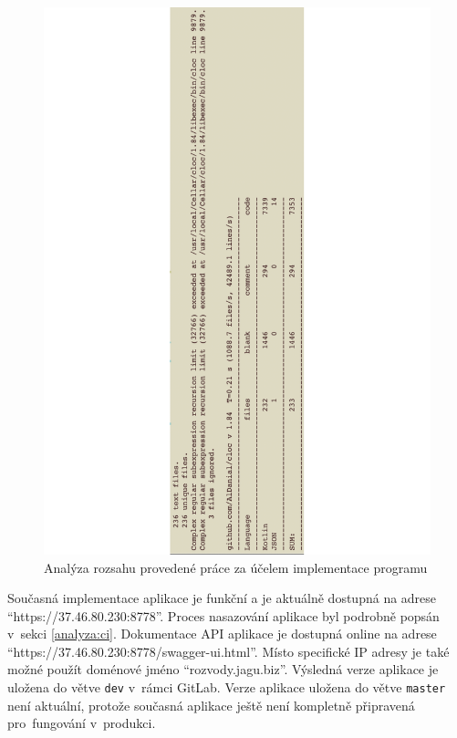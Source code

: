         \begin{figure}\centering
        	   \includegraphics[angle=-90, width=1.0\textwidth]{pdfs/CodeAmountImpl2}
        	   \caption[Analýza kódu implementace]{Analýza rozsahu provedené práce za účelem implementace programu}\label{image:code-count-main}
        \end{figure}
        
        Současná implementace aplikace je funkční a je aktuálně dostupná na adrese \enquote{https://37.46.80.230:8778}. Proces nasazování aplikace byl podrobně popsán v~sekci \ref{analyza:ci}. Dokumentace API aplikace je dostupná online na adrese \enquote{https://37.46.80.230:8778/swagger-ui.html}. Místo specifické IP adresy je také možné použít doménové jméno \enquote{rozvody.jagu.biz}. Výsledná verze aplikace je uložena do větve \verb|dev| v~rámci GitLab.
        Verze aplikace uložena do větve \verb|master| není aktuální, protože současná aplikace ještě není kompletně připravená pro~fungování v~produkci.
        
